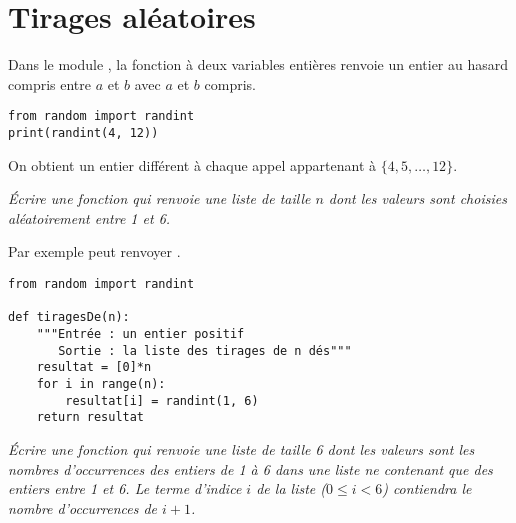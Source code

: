 \section{Tirages aléatoires  } 
Dans le module , la fonction à deux variables entières  renvoie un entier au hasard compris entre $a$ et $b$ avec $a$ et $b$ compris.
\begin{lstlisting}
from random import randint
print(randint(4, 12))
\end{lstlisting}
On obtient un entier différent à chaque appel appartenant à $\{4, 5, \ldots, 12\}$.
\begin{Exercise}[title= Tirages de dés]\it
Écrire une fonction  qui renvoie une liste de taille $n$ dont les valeurs sont choisies aléatoirement entre 1 et 6.

Par exemple  peut renvoyer 
\type{[6, 5, 3, 3, 2, 2, 6, 4, 6, 5, 6, 1]}.
\end{Exercise}
\begin{Answer}
\begin{lstlisting}
from random import randint

def tiragesDe(n):
 	"""Entrée : un entier positif
 	   Sortie : la liste des tirages de n dés""" 
    resultat = [0]*n
    for i in range(n):
        resultat[i] = randint(1, 6)
    return resultat
\end{lstlisting}
\newpage
\end{Answer}
\begin{Exercise}[title= Occurrences]\it
Écrire une fonction  qui renvoie une liste de taille 6 dont les valeurs sont les nombres d’occurrences des entiers de 1 à 6 dans une liste ne contenant que des entiers entre 1 et 6. Le terme d'indice $i$ de la liste ($0\le i < 6$) contiendra le nombre d’occurrences de $i+1$.
\end{Exercise}
